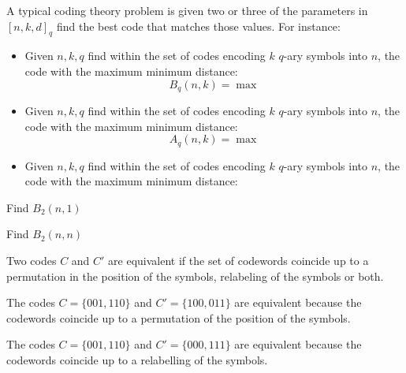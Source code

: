 A typical coding theory problem is given two or three of the parameters in $[n,k,d]_q$ find the best code that matches those values. For instance:
\begin{itemize}
\item Given $n,k,q$ find within the set of codes encoding $k$ $q$-ary symbols into $n$, the code with the maximum minimum distance:
\begin{equation}
B_q(n,k)=\max
\end{equation}
\item Given $n,k,q$ find within the set of codes encoding $k$ $q$-ary symbols into $n$, the code with the maximum minimum distance:
\begin{equation}
A_q(n,k)=\max
\end{equation}
\item Given $n,k,q$ find within the set of codes encoding $k$ $q$-ary symbols into $n$, the code with the maximum minimum distance:
\end{itemize}
\begin{exercise}
Find $B_2(n,1)$
\end{exercise}
\begin{exercise}
Find $B_2(n,n)$
\end{exercise}
\begin{definition}
Two codes $C$ and $C'$ are equivalent if the set of codewords coincide up to a permutation in the position of the symbols, relabeling of the symbols or both.
\end{definition}
\begin{example}
The codes $C=\{001,110\}$ and $C'=\{100,011\}$ are equivalent because the codewords coincide up to a permutation of the position of the symbols.
\end{example}
\begin{example}
The codes $C=\{001,110\}$ and $C'=\{000,111\}$ are equivalent because the codewords coincide up to a relabelling of the symbols.
\end{example}

